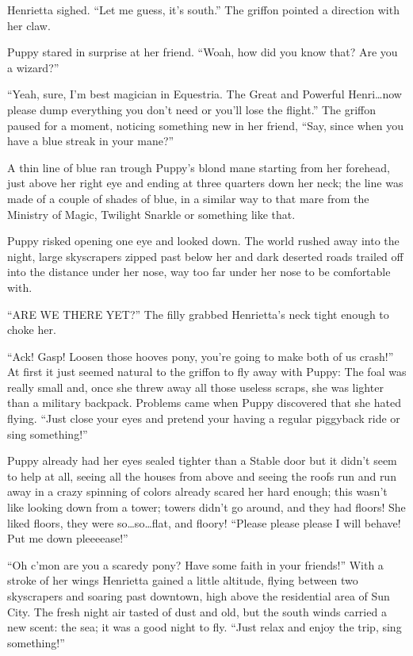 Henrietta sighed. ``Let me guess, it's south.'' The griffon pointed a direction with her claw.

Puppy stared in surprise at her friend. ``Woah, how did you know that? Are you a wizard?''

``Yeah, sure, I'm best magician in Equestria. The Great and Powerful Henri\dots now please dump everything you don't need or you'll lose the flight.'' The griffon paused for a moment, noticing something new in her friend, ``Say, since when you have a blue streak in your mane?''

A thin line of blue ran trough Puppy's blond mane starting from her forehead, just above her right eye and ending at three quarters down her neck; the line was made of a couple of shades of blue, in a similar way to that mare from the Ministry of Magic, Twilight Snarkle or something like that.

\horizonline


Puppy risked opening one eye and looked down. The world rushed away into the night, large skyscrapers zipped past below her and dark deserted roads trailed off into the distance under her nose, way too far under her nose to be comfortable with.

``ARE WE THERE YET?'' The filly grabbed Henrietta's neck tight enough to choke her.

``Ack! Gasp! Loosen those hooves pony, you're going to make both of us crash!'' At first it just seemed natural to the griffon to fly away with Puppy: The foal was really small and, once she threw away all those useless scraps, she was lighter than a military backpack. Problems came when Puppy discovered that she hated flying. ``Just close your eyes and pretend your having a regular piggyback ride or sing something!''

Puppy already had her eyes sealed tighter than a Stable door but it didn't seem to help at all, seeing all the houses from above and seeing the roofs run and run away in a crazy spinning of colors already scared her hard enough; this wasn't like looking down from a tower; towers didn't go around, and they had floors! She liked floors, they were so\dots so\dots flat, and floory! ``Please please please I will behave! Put me down pleeeease!''

``Oh c'mon are you a scaredy pony? Have some faith in your friends!'' With a stroke of her wings Henrietta gained a little altitude, flying between two skyscrapers and soaring past downtown, high above the residential area of Sun City. The fresh night air tasted of dust and old, but the south winds carried a new scent: the sea; it was a good night to fly. ``Just relax and enjoy the trip, sing something!''

